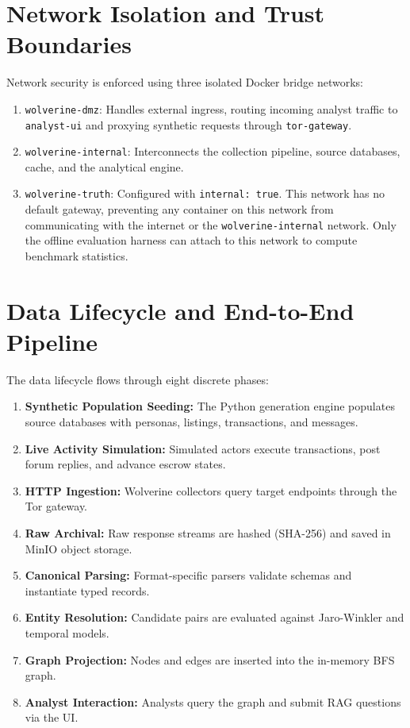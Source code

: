 \section{Network Isolation and Trust Boundaries}
\label{sec:arch-network-isolation}
Network security is enforced using three isolated Docker bridge networks:
\begin{enumerate}
    \item \texttt{wolverine-dmz}: Handles external ingress, routing incoming analyst traffic to \texttt{analyst-ui} and proxying synthetic requests through \texttt{tor-gateway}.
    \item \texttt{wolverine-internal}: Interconnects the collection pipeline, source databases, cache, and the analytical engine.
    \item \texttt{wolverine-truth}: Configured with \texttt{internal: true}. This network has no default gateway, preventing any container on this network from communicating with the internet or the \texttt{wolverine-internal} network. Only the offline evaluation harness can attach to this network to compute benchmark statistics.
\end{enumerate}

\section{Data Lifecycle and End-to-End Pipeline}
\label{sec:arch-data-lifecycle}
The data lifecycle flows through eight discrete phases:
\begin{enumerate}
    \item \textbf{Synthetic Population Seeding:} The Python generation engine populates source databases with personas, listings, transactions, and messages.
    \item \textbf{Live Activity Simulation:} Simulated actors execute transactions, post forum replies, and advance escrow states.
    \item \textbf{HTTP Ingestion:} Wolverine collectors query target endpoints through the Tor gateway.
    \item \textbf{Raw Archival:} Raw response streams are hashed (SHA-256) and saved in MinIO object storage.
    \item \textbf{Canonical Parsing:} Format-specific parsers validate schemas and instantiate typed records.
    \item \textbf{Entity Resolution:} Candidate pairs are evaluated against Jaro-Winkler and temporal models.
    \item \textbf{Graph Projection:} Nodes and edges are inserted into the in-memory BFS graph.
    \item \textbf{Analyst Interaction:} Analysts query the graph and submit RAG questions via the UI.
\end{enumerate}


